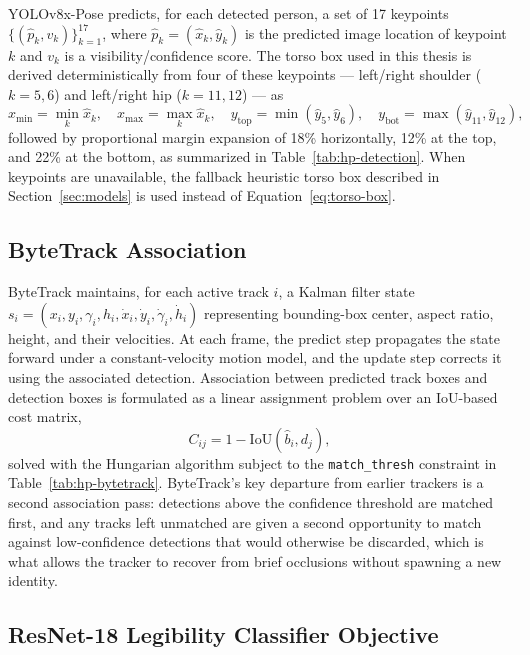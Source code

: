 YOLOv8x-Pose predicts, for each detected person, a set of 17 keypoints
$\{(\hat{p}_k, v_k)\}_{k=1}^{17}$, where $\hat{p}_k = (\hat{x}_k,
\hat{y}_k)$ is the predicted image location of keypoint $k$ and $v_k$
is a visibility/confidence score. The torso box used in this thesis is
derived deterministically from four of these keypoints --- left/right
shoulder ($k{=}5,6$) and left/right hip ($k{=}11,12$) --- as
\begin{equation}
    x_{\min} = \min_k \hat{x}_k, \quad
    x_{\max} = \max_k \hat{x}_k, \quad
    y_{\text{top}} = \min(\hat{y}_5, \hat{y}_6), \quad
    y_{\text{bot}} = \max(\hat{y}_{11}, \hat{y}_{12}),
    \label{eq:torso-box}
\end{equation}
followed by proportional margin expansion of 18\% horizontally, 12\%
at the top, and 22\% at the bottom, as summarized in
Table~\ref{tab:hp-detection}. When keypoints are unavailable, the
fallback heuristic torso box described in
Section~\ref{sec:models} is used instead of
Equation~\ref{eq:torso-box}.

\subsection{ByteTrack Association}

ByteTrack maintains, for each active track $i$, a Kalman filter state
$s_i = (x_i, y_i, \gamma_i, h_i, \dot{x}_i, \dot{y}_i, \dot{\gamma}_i,
\dot{h}_i)$ representing bounding-box center, aspect ratio, height, and
their velocities. At each frame, the predict step propagates the state
forward under a constant-velocity motion model, and the update step
corrects it using the associated detection. Association between
predicted track boxes and detection boxes is formulated as a linear
assignment problem over an IoU-based cost matrix,
\begin{equation}
    C_{ij} = 1 - \text{IoU}(\hat{b}_i, d_j),
    \label{eq:bytetrack-cost}
    \end{equation}
solved with the Hungarian algorithm subject to the
\texttt{match\_thresh} constraint in Table~\ref{tab:hp-bytetrack}.
ByteTrack's key departure from earlier trackers is a second association
pass: detections above the confidence threshold are matched first, and
any tracks left unmatched are given a second opportunity to match
against low-confidence detections that would otherwise be discarded,
which is what allows the tracker to recover from brief occlusions
without spawning a new identity.

\subsection{ResNet-18 Legibility Classifier Objective}

